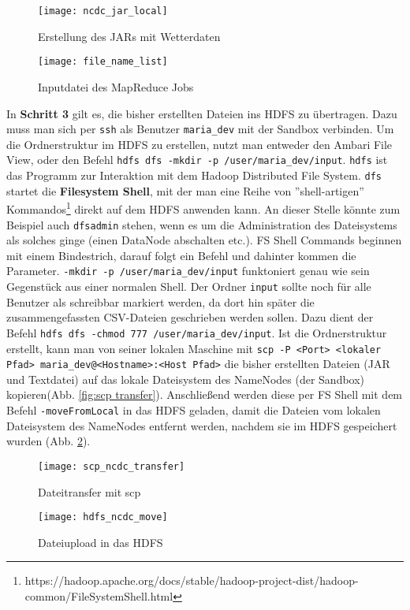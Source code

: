 \begin{figure}[ht]
    \centering
    \texttt{[image: ncdc\_jar\_local]}
    \caption[Erstellung des JARs mit Wetterdaten]{Erstellung des JARs mit Wetterdaten}
    \label{fig:ncdc jar local}
    \texttt{[image: file\_name\_list]}
    \caption[Inputdatei des MapReduce Jobs]{Inputdatei des MapReduce Jobs}
    \label{fig:file names txt local}
\end{figure}

In \textbf{Schritt 3} gilt es, die bisher erstellten Dateien ins HDFS zu übertragen. Dazu muss man sich per \verb|ssh| als Benutzer \verb|maria_dev| mit der Sandbox verbinden. Um die Ordnerstruktur im HDFS zu erstellen, nutzt man entweder den Ambari File View, oder den Befehl \verb|hdfs dfs -mkdir -p /user/maria_dev/input|. \verb|hdfs| ist das Programm zur Interaktion mit dem Hadoop Distributed File System. \verb|dfs| startet die \textbf{Filesystem Shell}, mit der man eine Reihe von ''shell-artigen'' Kommandos\footnote{https://hadoop.apache.org/docs/stable/hadoop-project-dist/hadoop-common/FileSystemShell.html} direkt auf dem HDFS anwenden kann. An dieser Stelle könnte zum Beispiel auch \verb|dfsadmin| stehen, wenn es um die Administration des Dateisystems als solches ginge (einen DataNode abschalten etc.). FS Shell Commands beginnen mit einem Bindestrich, darauf folgt ein Befehl und dahinter kommen die Parameter. \verb|-mkdir -p /user/maria_dev/input| funktoniert genau wie sein Gegenstück aus einer normalen Shell. Der Ordner \verb|input| sollte noch für alle Benutzer als schreibbar markiert werden, da dort hin später die zusammengefassten CSV-Dateien geschrieben werden sollen. Dazu dient der Befehl \verb|hdfs dfs -chmod 777 /user/maria_dev/input|. Ist die Ordnerstruktur erstellt, kann man von seiner lokalen Maschine mit \verb|scp -P <Port> <lokaler Pfad> maria_dev@<Hostname>:<Host Pfad>| die bisher erstellten Dateien (JAR und Textdatei) auf das lokale Dateisystem des NameNodes (der Sandbox) kopieren(Abb. \ref{fig:scp transfer}). Anschließend werden diese per FS Shell mit dem Befehl \verb|-moveFromLocal| in das HDFS geladen, damit die Dateien vom lokalen Dateisystem des NameNodes entfernt werden, nachdem sie im HDFS gespeichert wurden (Abb. \ref{fig:hdfs move}).

\begin{figure}[ht]
    \centering
    \texttt{[image: scp\_ncdc\_transfer]}
    \caption[Dateitransfer mit scp]{Dateitransfer mit scp}
    \label{fig:scp transfer}
    \texttt{[image: hdfs\_ncdc\_move]}
    \caption[Dateiupload in das HDFS]{Dateiupload in das HDFS}
    \label{fig:hdfs move}
\end{figure}

